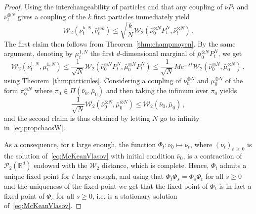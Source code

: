 \documentclass[10pt]{amsart}
\theoremstyle{definition}\newtheorem{defi}[theo]{Definition}\newtheorem{rema}[theo]{Remark}\newtheorem{exam}[theo]{Example}\newtheorem{exem}[theo]{Example}\newtheorem{nota}[theo]{Notation}
\newcommand{\R}{\mathbb R}
\newcommand{\clP}{\mathcal P}
\newcommand{\clW}{\mathcal W}
\newcommand{\1}{\mathbbm{1}}
\begin{document}
\begin{proof}
Using the interchangeability of particles and that any coupling of $\nu P_t$ and $\bar \nu_t^{\otimes N}$ gives a coupling of the $k$ first particles immediately yield
\[
\clW_2\left( \nu_t^{k,N},\bar \nu_t^{\otimes k}\right) \leqslant \sqrt{\frac kN}\clW_2\left( \bar \nu_0^{\otimes N} P_t^N,\bar \nu_t^{\otimes N}\right)\,.
\]
The first claim then follows from Theorem~\ref{thm:champmoyen}. By the same argument, denoting by $\mu_t^{1,N}$ the first $d$-dimensional marginal of $\bar \mu_0^{\otimes N} P_t^N$, we get
\begin{equation}\label{eq:propchaosW}
\clW_2\left( \nu_t^{1,N},\mu_t^{1,N}\right) \leqslant \frac1{\sqrt N} \clW_2\left( \bar \nu_0^{\otimes N} P_t^N,\bar \mu_0^{\otimes N} P_t^N\right) \leqslant \frac1{\sqrt N} M e^{-\lambda t}\clW_2\left( \bar \nu_0^{\otimes N},\bar \mu_0^{\otimes N}\right)\,,
\end{equation}
using Theorem~\ref{thm:particules}. Considering a coupling of $\bar \nu_0^{\otimes N}$ and $\bar \mu_0^{\otimes N}$ of the form $\pi_0^{\otimes N}$ where $\pi_0 \in \Pi(\bar \nu_0,\bar \mu_0)$ and then taking the infimum over $\pi_0$ yields
\[
\frac{1}{\sqrt N}\clW_2\left(\bar \nu_0^{\otimes N},\bar \mu_0^{\otimes N}\right) \leqslant \clW_2\left( \bar \nu_0,\bar \mu_0\right)\,,
\]
and the second claim is thus obtained by letting $N$ go to infinity in~\eqref{eq:propchaosW}.

As a consequence, for $t$ large enough, the function $\Phi_t:\bar \nu_0 \mapsto \bar \nu_t$, where $(\bar \nu_t)_{t\,\geqslant\,0}$ is the solution of~\eqref{eq:McKeanVlasov} with initial condition $\bar\nu_0$, is a contraction of $\clP_2(\R^d)$ endowed with the $\clW_2$ distance, which is complete. Hence, $\Phi_t$ admits a unique fixed point for $t$ large enough, and using that $\Phi_t \Phi_s= \Phi_s \Phi_t$ for all $s\geqslant 0$ and the uniqueness of the fixed point we get that the fixed point of $\Phi_t$ is in fact a fixed point of $\Phi_s$ for all $s\geqslant 0$, i.e. is a stationary solution of~\eqref{eq:McKeanVlasov}.


\end{proof}
\end{document}
